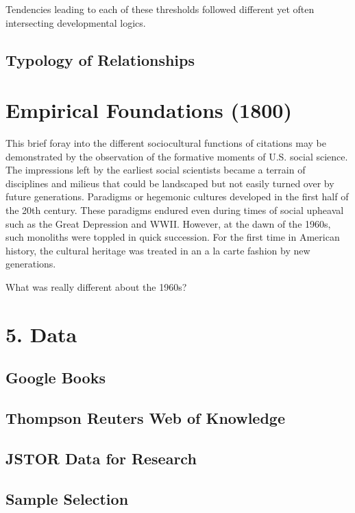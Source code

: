 \documentclass[]{article}
\begin{document}
Tendencies leading to each of these thresholds followed different yet
often intersecting developmental logics.

\subsection{Typology of Relationships}\label{typology-of-relationships}

\section{Empirical Foundations (1800)}\label{empirical-foundations-1800}

This brief foray into the different sociocultural functions of citations
may be demonstrated by the observation of the formative moments of U.S.
social science. The impressions left by the earliest social scientists
became a terrain of disciplines and milieus that could be landscaped but
not easily turned over by future generations. Paradigms or hegemonic
cultures developed in the first half of the 20th century. These
paradigms endured even during times of social upheaval such as the Great
Depression and WWII. However, at the dawn of the 1960s, such monoliths
were toppled in quick succession. For the first time in American
history, the cultural heritage was treated in an a la carte fashion by
new generations.

What was really different about the 1960s?

\section{5. Data}\label{data}

\subsection{Google Books}\label{google-books}

\subsection{Thompson Reuters Web of
Knowledge}\label{thompson-reuters-web-of-knowledge}

\subsection{JSTOR Data for Research}\label{jstor-data-for-research}

\subsection{Sample Selection}\label{sample-selection}
\end{document}
